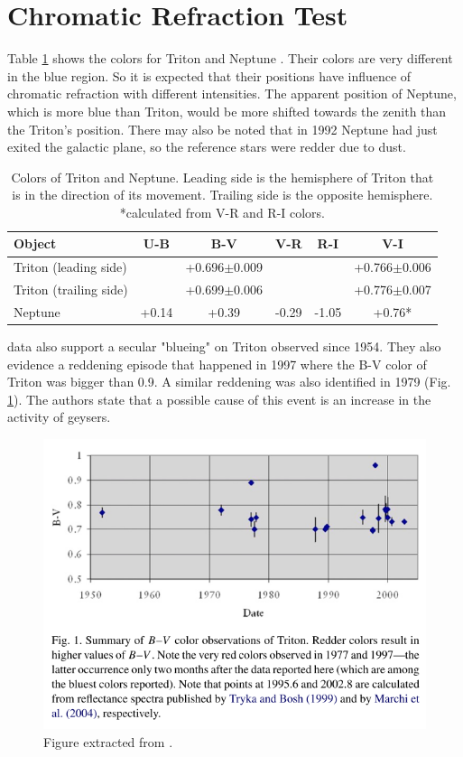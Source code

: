 \documentclass[12pt,a4paper]{report}
\begin{document}
\section*{Chromatic Refraction Test}

Table \ref{Tab:colors} shows the colors for Triton \citep{Pascu2006} and Neptune \cite{Schmude2016}. Their colors are very different in the blue region. So it is expected that their positions have influence of chromatic refraction with different intensities. The apparent position of Neptune, which is more blue than Triton, would be more shifted towards the zenith than the Triton's position. There may also be noted that in 1992 Neptune had just exited the galactic plane, so the reference stars were redder due to dust.

\begin{table}[h]
\centering
\begin{tabular}{|l|c|c|c|c|c|}
\hline
Object & U-B & B-V & V-R & R-I & V-I\\
\hline
Triton (leading side) & & +0.696$\pm$0.009 & & & +0.766$\pm$0.006 \\
Triton (trailing side) & & +0.699$\pm$0.006 & & & +0.776$\pm$0.007 \\
Neptune & +0.14 & +0.39 & -0.29 & -1.05 & +0.76*\\
\hline
\end{tabular}
\caption{Colors of Triton and Neptune. Leading side is the hemisphere of Triton that is in the direction of its movement. Trailing side is the opposite hemisphere. \\ *calculated from V-R and R-I colors.}
\label{Tab:colors}
\end{table}

\citep{Pascu2006} data also support a secular "blueing" on Triton observed since 1954. They also evidence a reddening episode that happened in 1997 where the B-V color of Triton was bigger than 0.9. A similar reddening was also identified in 1979 (Fig. \ref{Fig:Pascu}). The authors state that a possible cause of this event is an increase in the activity of geysers.

\begin{figure}[h]
\centering
\includegraphics[scale=0.7]{Pascu.png}
\caption{Figure extracted from \cite{Pascu2006}. \label{Fig:Pascu}}
\end{figure}
\end{document}
